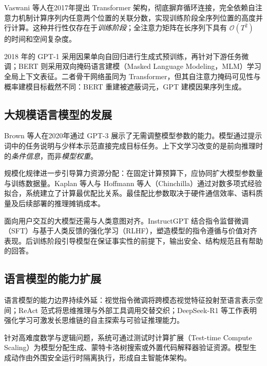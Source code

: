 \documentclass[../textbook.tex]{subfiles}
\begin{document}
Vaswani 等人在2017年提出 Transformer 架构，彻底摒弃循环连接，完全依赖自注意力机制计算序列内任意两个位置的关联分数，实现训练阶段全序列位置的高度并行计算\cite{vaswani2017attention}。这种并行性仅存在于\emph{训练阶段}；全注意力矩阵在长序列下具有 $\mathcal{O}(T^2)$ 的时间和空间复杂度。

2018 年的 GPT-1 采用因果单向自回归进行生成式预训练，再针对下游任务微调\cite{radfordImprovingLanguageUnderstanding2018}；BERT 则采用双向掩码语言建模（Masked Language Modeling，MLM）学习全局上下文表征\cite{devlinBERTPretrainingDeep2019}。二者骨干网络虽同为 Transformer，但其自注意力掩码可见性与概率建模目标截然不同：BERT 重建被遮蔽词元，GPT 建模因果序列生成。

\subsection{大规模语言模型的发展}
Brown 等人在2020年通过 GPT-3 展示了无需调整模型参数的能力\cite{brown2020fewshot}。模型通过提示词中的任务说明与少样本示范直接完成目标任务。上下文学习改变的是前向推理时的\emph{条件信息}，而非\emph{模型权重}。

规模化规律进一步引导算力资源分配：在固定计算预算下，应协同扩大模型参数量与训练数据量。Kaplan 等人与 Hoffmann 等人（Chinchilla）通过对数多项式经验拟合，系统建立了计算最优配比关系\cite{kaplan2020scaling,hoffmann2022chinchilla}。最佳配比参数取决于硬件通信效率、语料质量及后续部署的推理摊销成本。

面向用户交互的大模型还需与人类意图对齐。InstructGPT 结合指令监督微调（SFT）与基于人类反馈的强化学习（RLHF），塑造模型的指令遵循与价值对齐表现\cite{ouyang2022instructgpt}。后训练阶段引导模型在保证事实性的前提下，输出安全、结构规范且有帮助的回答。

\subsection{语言模型的能力扩展}
语言模型的能力边界持续外延：视觉指令微调将跨模态视觉特征投射至语言表示空间\cite{liu2023visualinstruction}；ReAct 范式将思维推理与外部工具调用交替交织\cite{yao2023react}；DeepSeek-R1 等工作表明强化学习可激发长思维链的自主探索与可验证推理能力\cite{deepseek2025r1}。

针对高难度数学与逻辑问题，系统可通过测试时计算扩展（Test-time Compute Scaling）为模型分配生成、蒙特卡洛树搜索或外置代码解释器验证资源。模型生成动作由外围安全运行时隔离执行，形成自主智能体架构。
\end{document}
